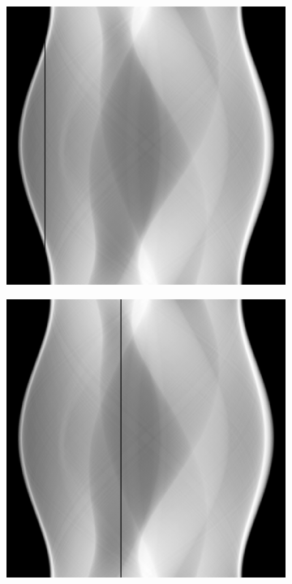 \documentclass[letterpaper,12pt]{article}
\theoremstyle{plain}
\begin{document}
\begin{figure}[H]
   \centering
       \begin{subfigure}[h]{0.24\textwidth}
           \centering
           \includegraphics[width=\textwidth]{Figuras/sinograma_50.png} 
       \end{subfigure}
       \begin{subfigure}[h]{0.24\textwidth}
           \centering
           \includegraphics[width=\textwidth]{Figuras/sinograma_150.png}

\end{subfigure}
\end{figure}
\end{document}
